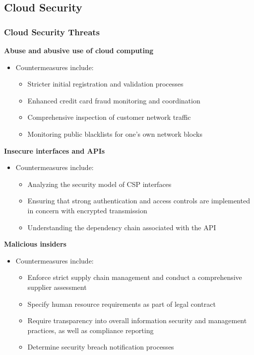 \newpage

\subsection{Cloud Security}

\subsubsection{Cloud Security Threats}


\textbf{Abuse and abusive use of cloud computing}
\begin{itemize}
    \item Countermeasures include:
    \begin{itemize}
        \item Stricter initial registration and validation processes
        \item Enhanced credit card fraud monitoring and coordination
        \item Comprehensive inspection of customer network traffic
        \item Monitoring public blacklists for one's own network blocks\\
    \end{itemize}
\end{itemize}

\textbf{Insecure interfaces and APIs}
\begin{itemize}
    \item Countermeasures include:
    \begin{itemize}
        \item Analyzing the security model of CSP interfaces
        \item Ensuring that strong authentication and access controls are implemented in concern with encrypted transmission
        \item Understanding the dependency chain associated with the API\\
    \end{itemize}
\end{itemize}

\textbf{Malicious insiders}
\begin{itemize}
    \item Countermeasures include:
    \begin{itemize}
        \item Enforce strict supply chain management and conduct a comprehensive supplier assessment
        \item Specify human resource requirements as part of legal contract
        \item Require transparency into overall information security and management practices, as well as compliance reporting
        \item Determine security breach notification processes\\
    \end{itemize}
\end{itemize}

